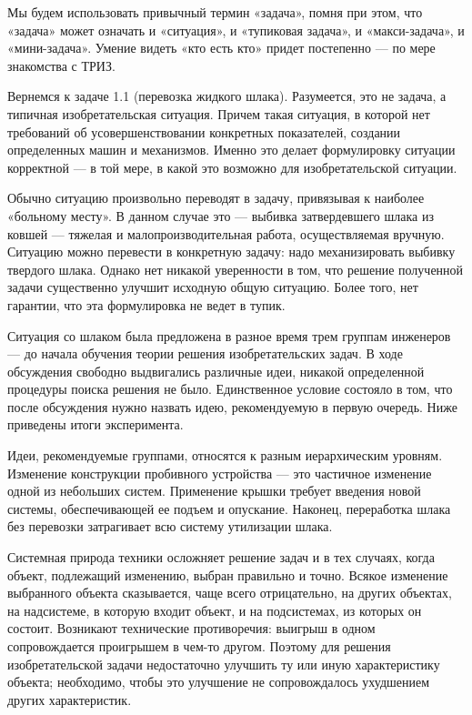 Мы  будем  использовать привычный  термин  «задача»,  помня при  этом,
что  «задача» может  означать и  «ситуация», и  «тупиковая задача»,  и
«макси-задача», и  «мини-задача». Умение видеть «кто  есть кто» придет
постепенно — по мере знакомства с ТРИЗ.


Вернемся к  задаче 1.1 (перевозка  жидкого шлака). Разумеется,  это не
задача, а типичная изобретательская ситуация. Причем такая ситуация, в
которой нет  требований об усовершенствовании  конкретных показателей,
создании   определенных  машин   и  механизмов.   Именно  это   делает
формулировку ситуации  корректной — в  той мере, в какой  это возможно
для изобретательской ситуации.

Обычно ситуацию произвольно переводят  в задачу, привязывая к наиболее
«больному месту».  В данном случае  это — выбивка  затвердевшего шлака
из  ковшей —  тяжелая  и  малопроизводительная работа,  осуществляемая
вручную.   Ситуацию  можно   перевести  в   конкретную  задачу:   надо
механизировать выбивку твердого шлака.  Однако нет никакой уверенности
в  том, что  решение  полученной задачи  существенно улучшит  исходную
общую  ситуацию. Более  того, нет  гарантии, что  эта формулировка  не
ведет в тупик.

Ситуация  со  шлаком  была  предложена в  разное  время  трем  группам
инженеров — до начала  обучения теории решения изобретательских задач.
В  ходе  обсуждения  свободно   выдвигались  различные  идеи,  никакой
определенной процедуры  поиска решения  не было.  Единственное условие
состояло в том, что после обсуждения нужно назвать идею, рекомендуемую
в первую очередь. Ниже приведены итоги эксперимента.



Идеи,  рекомендуемые   группами,  относятся  к   разным  иерархическим
уровням. Изменение  конструкции пробивного устройства —  это частичное
изменение  одной  из  небольших   систем.  Применение  крышки  требует
введения новой системы, обеспечивающей ее подъем и опускание. Наконец,
переработка  шлака без  перевозки затрагивает  всю систему  утилизации
шлака.


Системная природа  техники осложняет  решение задач  и в  тех случаях,
когда объект,  подлежащий изменению, выбран правильно  и точно. Всякое
изменение  выбранного объекта  сказывается,  чаще всего  отрицательно,
на  других  объектах,  на  надсистеме,  в  которую  входит  объект,  и
на  подсистемах,   из  которых   он  состоит.   Возникают  технические
противоречия:  выигрыш  в  одном сопровождается  проигрышем  в  чем-то
другом.  Поэтому  для  решения  изобретательской  задачи  недостаточно
улучшить  ту или  иную характеристику  объекта; необходимо,  чтобы это
улучшение не сопровождалось ухудшением других характеристик.


